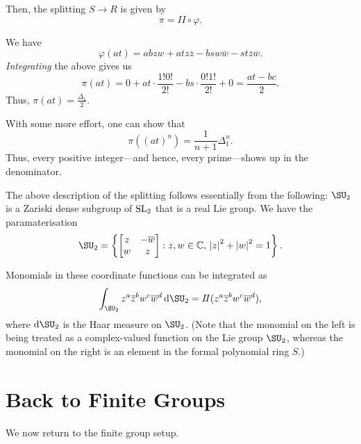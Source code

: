 \documentclass[12pt]{article}
\newcommand{\myint}{I\!I}
\begin{document}
Then, the splitting $S \to R$ is given by
\begin{equation*} 
	\pi = \myint \circ \varphi.
\end{equation*}

\begin{ex}
	We have 
	\begin{equation*} 
		\varphi(at) = a b z w + a t z \overline{z} - b s w \overline{w} - s t \overline{z} \overline{w}.
	\end{equation*}
	\emph{Integrating} the above gives us
	\begin{equation*} 
		\pi(at) = 0 + at \cdot \dfrac{1!0!}{2!} - bs \cdot \dfrac{0!1!}{2!} + 0 = \frac{at - bc}{2}.
	\end{equation*}
	Thus, $\pi(at) = \frac{\Delta_{1}}{2}$.

	With some more effort, one can show that
	\begin{equation*} 
		\pi\left((at)^{n}\right) = \frac{1}{n + 1}\Delta_{1}^{n}.
	\end{equation*}
	Thus, every positive integer---and hence, every prime---shows up in the denominator.
\end{ex}

The above description of the splitting follows essentially from the following: $\SU_{2}$ is a Zariski dense subgroup of $\operatorname{SL}_{2}$ that is a real Lie group. We have the paramaterisation 
\begin{equation*} 
	\SU_{2} = \left\{\two{z}{-\overline{w}}{w}{z} : z, w \in \mathbb{C},\, \md{z}^{2} + \md{w}^{2} = 1 \right\}.
\end{equation*}

Monomials in these coordinate functions can be integrated as
\begin{equation*} 
	\int_{\SU_{2}} z^{a} \overline{z}^{b} w^{c} \overline{w}^{d} \,{\mathrm{d}}{\SU_{2}} = \myint(z^{a} \overline{z}^{b} w^{c} \overline{w}^{d}),
\end{equation*}
where ${\mathrm{d}}{\SU_{2}}$ is the Haar measure on $\SU_{2}$. (Note that the monomial on the left is being treated as a complex-valued function on the Lie group $\SU_{2}$, whereas the monomial on the right is an element in the formal polynomial ring $S$.)

\section{Back to Finite Groups}

We now return to the finite group setup.
\end{document}
